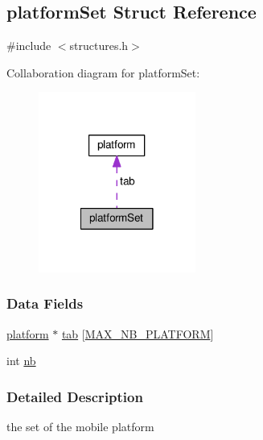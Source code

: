 \hypertarget{structplatform_set}{\subsection{platform\-Set Struct Reference}
\label{structplatform_set}
}


{\ttfamily \#include $<$structures.\-h$>$}



Collaboration diagram for platform\-Set\-:\nopagebreak
\begin{figure}[H]
\begin{center}
\leavevmode
\includegraphics[width=146pt]{structplatform_set__coll__graph}
\end{center}
\end{figure}
\subsubsection*{Data Fields}
\begin{DoxyCompactItemize}
\item 
\hyperlink{structplatform}{platform} $\ast$ \hyperlink{structplatform_set_adc68016a9ab856bd20fb14c5c71c234a}{tab} \mbox{[}\hyperlink{const_8h_aefda3e54987cddb9821a74090f767366}{M\-A\-X\-\_\-\-N\-B\-\_\-\-P\-L\-A\-T\-F\-O\-R\-M}\mbox{]}
\item 
int \hyperlink{structplatform_set_ab310c6afcc676eab3930dce2650511c0}{nb}
\end{DoxyCompactItemize}


\subsubsection{Detailed Description}
the set of the mobile platform 

